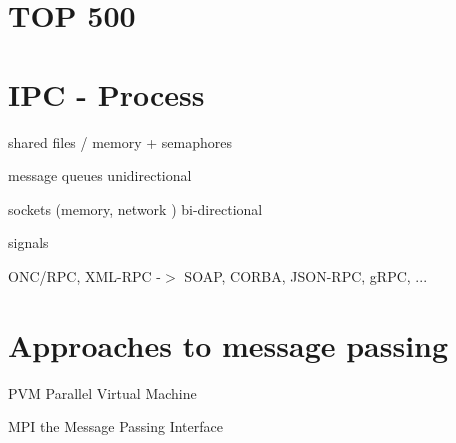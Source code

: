 \documentclass{article}
\begin{document}
\section*{TOP 500}

\begin{compactitem}
\item {}
\item {}
\item {}
\end{compactitem}

\section*{IPC - Process}

\begin{compactitem}
\item shared files / memory + semaphores
\item {}
\item message queues                unidirectional
\item sockets (memory, network )    bi-directional
\item signals
\item {}
  \begin{compactitem}
  \item ONC/RPC, XML-RPC -$>$ SOAP, CORBA, JSON-RPC, gRPC, ...
  \end{compactitem}
\end{compactitem}

\section*{Approaches to message passing}

\begin{compactdesc}
\item[PVM]
    Parallel Virtual Machine
\item[MPI the Message Passing Interface]
\end{compactdesc}
\end{document}
